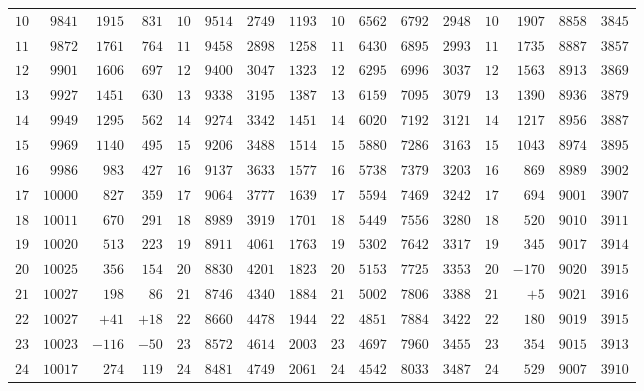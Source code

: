 \begin{center}
{{\begin{minipage}{.96\linewidth}
\begin{tabular}{r|r|r|r||r|r|r|r||r|r|r|r||r|r|r|r}
$10$ & $9841$ & $1915$ & $831$ & $10$ & $9514$ & $2749$ & $1193$ & $10$ & $6562$ & $6792$ & $2948$ & $10$ & $1907$ & $8858$ & $3845$\\[3pt]
$11$ & $9872$ & $1761$ & $764$ & $11$ & $9458$ & $2898$ & $1258$ & $11$ & $6430$ & $6895$ & $2993$ & $11$ & $1735$ & $8887$ & $3857$\\
$12$ & $9901$ & $1606$ & $697$ & $12$ & $9400$ & $3047$ & $1323$ & $12$ & $6295$ & $6996$ & $3037$ & $12$ & $1563$ & $8913$ & $3869$\\
$13$ & $9927$ & $1451$ & $630$ & $13$ & $9338$ & $3195$ & $1387$ & $13$ & $6159$ & $7095$ & $3079$ & $13$ & $1390$ & $8936$ & $3879$\\
$14$ & $9949$ & $1295$ & $562$ & $14$ & $9274$ & $3342$ & $1451$ & $14$ & $6020$ & $7192$ & $3121$ & $14$ & $1217$ & $8956$ & $3887$\\
$15$ & $9969$ & $1140$ & $495$ & $15$ & $9206$ & $3488$ & $1514$ & $15$ & $5880$ & $7286$ & $3163$ & $15$ & $1043$ & $8974$ & $3895$\\[3pt]
$16$ & $9986$ & $983$ & $427$ & $16$ & $9137$ & $3633$ & $1577$ & $16$ & $5738$ & $7379$ & $3203$ & $16$ & $869$ & $8989$ & $3902$\\
$17$ & $10000$ & $827$ & $359$ & $17$ & $9064$ & $3777$ & $1639$ & $17$ & $5594$ & $7469$ & $3242$ & $17$ & $694$ & $9001$ & $3907$\\
$18$ & $10011$ & $670$ & $291$ & $18$ & $8989$ & $3919$ & $1701$ & $18$ & $5449$ & $7556$ & $3280$ & $18$ & $520$ & $9010$ & $3911$\\
$19$ & $10020$ & $513$ & $223$ & $19$ & $8911$ & $4061$ & $1763$ & $19$ & $5302$ & $7642$ & $3317$ & $19$ & $345$ & $9017$ & $3914$\\
$20$ & $10025$ & $356$ & $154$ & $20$ & $8830$ & $4201$ & $1823$ & $20$ & $5153$ & $7725$ & $3353$ & $20$ & $-170$ & $9020$ & $3915$\\[3pt]
$21$ & $10027$ & $198$ & $86$ & $21$ & $8746$ & $4340$ & $1884$ & $21$ & $5002$ & $7806$ & $3388$ & $21$ & $+5$ & $9021$ & $3916$\\
$22$ & $10027$ & $+41$ & $+18$ & $22$ & $8660$ & $4478$ & $1944$ & $22$ & $4851$ & $7884$ & $3422$ & $22$ & $180$ & $9019$ & $3915$\\
$23$ & $10023$ & $-116$ & $-50$ & $23$ & $8572$ & $4614$ & $2003$ & $23$ & $4697$ & $7960$ & $3455$ & $23$ & $354$ & $9015$ & $3913$\\
$24$ & $10017$ & $274$ & $119$ & $24$ & $8481$ & $4749$ & $2061$ & $24$ & $4542$ & $8033$ & $3487$ & $24$ & $529$ & $9007$ & $3910$\\

\end{tabular}
\end{minipage}}}
\end{center}
